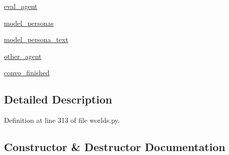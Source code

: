 \begin{DoxyCompactItemize}
\item 
\hyperlink{classprojects_1_1controllable__dialogue_1_1mturk_1_1worlds_1_1ControllableDialogEval_a0516aa56cda570506cc8b5efb02756cc}{eval\+\_\+agent}
\item 
\hyperlink{classprojects_1_1controllable__dialogue_1_1mturk_1_1worlds_1_1ControllableDialogEval_a77c385abcd738bbd5a15cdbe0289262d}{model\+\_\+personas}
\item 
\hyperlink{classprojects_1_1controllable__dialogue_1_1mturk_1_1worlds_1_1ControllableDialogEval_a0fe27b63b91f7f009e6a8afcae66db74}{model\+\_\+persona\+\_\+text}
\item 
\hyperlink{classprojects_1_1controllable__dialogue_1_1mturk_1_1worlds_1_1ControllableDialogEval_a327f0cfe1f11bcd29b129dda9b7c6cb4}{other\+\_\+agent}
\item 
\hyperlink{classprojects_1_1controllable__dialogue_1_1mturk_1_1worlds_1_1ControllableDialogEval_ae50ceac205de37d75020d34c8de50d36}{convo\+\_\+finished}
\end{DoxyCompactItemize}


\subsection{Detailed Description}


Definition at line 313 of file worlds.\+py.



\subsection{Constructor \& Destructor Documentation}
\mbox{\label{classprojects_1_1controllable__dialogue_1_1mturk_1_1worlds_1_1ControllableDialogEval_af8577bcfacb6749666bb1f86a37add05}} 
